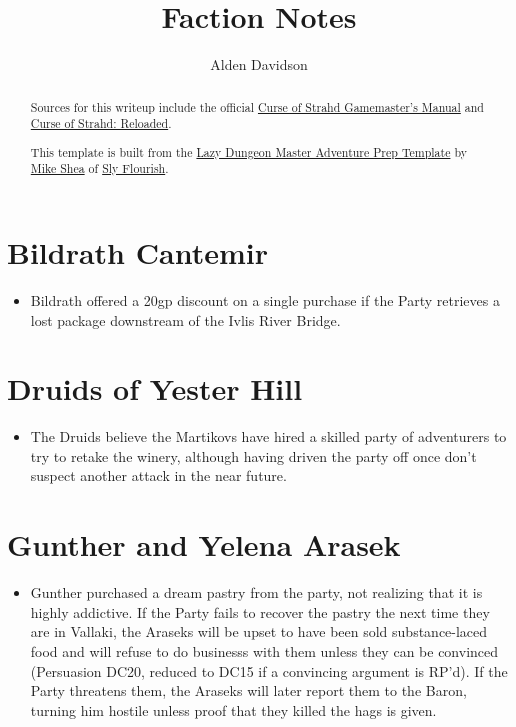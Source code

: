 \documentclass[a4paper,11pt]{article}
\title{Faction Notes}
\author{Alden Davidson}
\begin{document}
\maketitle
\tableofcontents

\begin{abstract}
  Sources for this writeup include the official
  \href{https://5e.tools/adventure.html#cos}{Curse of Strahd Gamemaster's Manual} and
  \href{https://www.reddit.com/r/CurseofStrahd/comments/9bpzbh/curse_of_strahd_reloaded_compilation_thread/}{Curse of Strahd: Reloaded}.
  
  This template is built from the
  \href{https://slyflourish.com/rotldm_template.html}{Lazy Dungeon Master Adventure Prep Template} by
  \href{https://slyflourish.com/about_mike_shea.html}{Mike Shea} of \href{https://slyflourish.com/}{Sly Flourish}.
\end{abstract}

\pagebreak
\section{Bildrath Cantemir}
\begin{itemize}
  \item Bildrath offered a 20gp discount on a single purchase if the Party retrieves a lost package downstream of
  the Ivlis River Bridge.
\end{itemize}

\section{Druids of Yester Hill}
\begin{itemize}
  \item The Druids believe the Martikovs have hired a skilled party of adventurers to try to retake the winery,
  although having driven the party off once don't suspect another attack in the near future.
\end{itemize}

\section{Gunther and Yelena Arasek}
\begin{itemize}
  \item Gunther purchased a dream pastry from the party, not realizing that it is highly addictive. If the Party
  fails to recover the pastry the next time they are in Vallaki, the Araseks will be upset to have been sold
  substance-laced food and will refuse to do businesss with them unless they can be convinced (Persuasion DC20,  
  reduced to DC15 if a convincing argument is RP'd). If the Party threatens them, the Araseks will later report
  them to the Baron, turning him hostile unless proof that they killed the hags is given.
\end{itemize}
\end{document}
